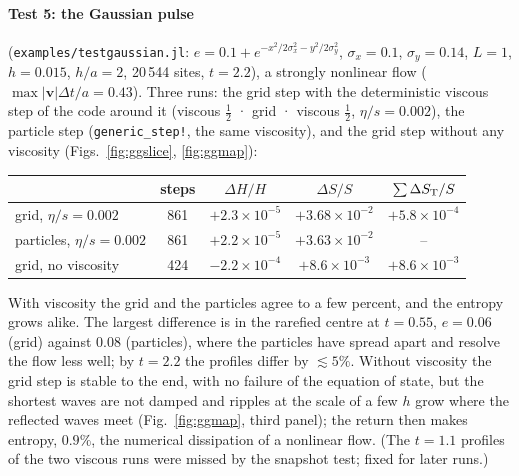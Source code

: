 \documentclass[11pt,aps,preprint,nofootinbib,superscriptaddress,tightenlines]{revtex4-2}
\def\Fig#1{Fig.~\ref{#1}}
\let\oldparagraph\paragraph
\renewcommand{\paragraph}{\par\bigskip\oldparagraph}
\begin{document}
\paragraph{Test 5: the Gaussian pulse} (\texttt{examples/testgaussian.jl}: $e=0.1+e^{-x^2/2\sigma_x^2-y^2/2\sigma_y^2}$,
$\sigma_x=0.1$, $\sigma_y=0.14$, $L=1$, $h=0.015$, $h/a=2$, 20\,544 sites, $t=2.2$), a strongly nonlinear flow
($\max|\bm v|\Delta t/a=0.43$).  Three runs: the grid step with the deterministic viscous step of the
code around it (viscous $\tfrac12$ · grid · viscous $\tfrac12$, $\eta/s=0.002$), the particle step
(\texttt{generic\_step!}, the same viscosity), and the grid step without any viscosity
(Figs.~\ref{fig:ggslice}, \ref{fig:ggmap}):
\begin{center}
\begin{tabular}{lcccc}
\hline
 & steps & $\Delta H/H$ & $\Delta S/S$ & $\sum\Delta S_{\rm T}/S$ \\ \hline
grid, $\eta/s=0.002$ & 861 & $+2.3\times10^{-5}$ & $+3.68\times10^{-2}$ & $+5.8\times10^{-4}$ \\
particles, $\eta/s=0.002$ & 861 & $+2.2\times10^{-5}$ & $+3.63\times10^{-2}$ & -- \\
grid, no viscosity & 424 & $-2.2\times10^{-4}$ & $+8.6\times10^{-3}$ & $+8.6\times10^{-3}$ \\
\hline
\end{tabular}
\end{center}
With viscosity the grid and the particles agree to a few percent, and the entropy grows alike.
The largest difference is in the rarefied centre at $t=0.55$, $e=0.06$ (grid) against $0.08$
(particles), where the particles have spread apart and resolve the flow less well; by $t=2.2$ the
profiles differ by $\lesssim5\%$.  Without viscosity the grid step is stable to the end, with no failure of the
equation of state, but the shortest waves are not damped and ripples at the scale of a few $h$
grow where the reflected waves meet (\Fig{fig:ggmap}, third panel); the return then makes
entropy, $0.9\%$, the numerical dissipation of a nonlinear flow.  (The $t=1.1$ profiles of the two
viscous runs were missed by the snapshot test; fixed for later runs.)
\end{document}
